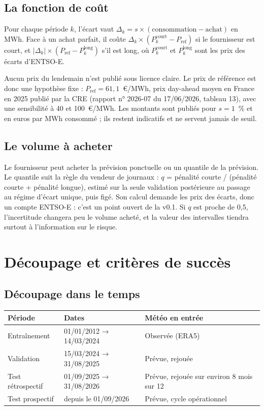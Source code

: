 \documentclass[11pt,a4paper]{article}
\begin{document}
\subsection{La fonction de coût}

Pour chaque période $k$, l'écart vaut $\Delta_k = s \times (\text{consommation} - \text{achat})$ en MWh. Face à un achat parfait, il coûte $\Delta_k \times (P^{\text{court}}_k - P_{\text{ref}})$ si le fournisseur est court, et $|\Delta_k| \times (P_{\text{ref}} - P^{\text{long}}_k)$ s'il est long, où $P^{\text{court}}_k$ et $P^{\text{long}}_k$ sont les prix des écarts d'ENTSO-E.

Aucun prix du lendemain n'est publié sous licence claire. Le prix de référence est donc une hypothèse fixe : $P_{\text{ref}} = 61{,}1$~€/MWh, prix day-ahead moyen en France en 2025 publié par la CRE (rapport n° 2026-07 du 17/06/2026, tableau 13), avec une sensibilité à 40 et 100~€/MWh. Les montants sont publiés pour $s = 1$~\% et en euros par MWh consommé ; ils restent indicatifs et ne servent jamais de seuil.

\subsection{Le volume à acheter}

Le fournisseur peut acheter la prévision ponctuelle ou un quantile de la prévision. Le quantile suit la règle du vendeur de journaux : $q$ = pénalité courte / (pénalité courte + pénalité longue), estimé sur la seule validation postérieure au passage au régime d'écart unique, puis figé. Son calcul demande les prix des écarts, donc un compte ENTSO-E : c'est un point ouvert de la v0.1. Si $q$ est proche de 0,5, l'incertitude changera peu le volume acheté, et la valeur des intervalles tiendra surtout à l'information sur le risque.

\section{Découpage et critères de succès}

\subsection{Découpage dans le temps}

\begin{table}[H]
\small
\begin{tabularx}{\linewidth}{llY}
\toprule
\textbf{Période} & \textbf{Dates} & \textbf{Météo en entrée} \\
\midrule
Entraînement & 01/01/2012 → 14/03/2024 & Observée (ERA5) \\
Validation & 15/03/2024 → 31/08/2025 & Prévue, rejouée \\
Test rétrospectif & 01/09/2025 → 31/08/2026 & Prévue, rejouée sur environ 8 mois sur 12 \\
Test prospectif & depuis le 01/09/2026 & Prévue, cycle opérationnel \\
\bottomrule
\end{tabularx}
\end{table}
\end{document}

